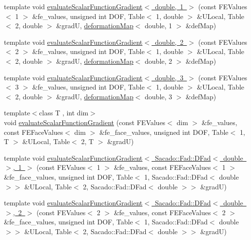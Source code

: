 \begin{DoxyCompactItemize}
\item 
template void \mbox{\hyperlink{function_evaluations_8cc_a3cc57fd0ac6ea503b820934671353e6f}{evaluate\+Scalar\+Function\+Gradient$<$ double, 1 $>$}} (const F\+E\+Values$<$ 1 $>$ \&fe\+\_\+values, unsigned int D\+OF, Table$<$ 1, double $>$ \&U\+Local, Table$<$ 2, double $>$ \&gradU, \mbox{\hyperlink{structdeformation_map}{deformation\+Map}}$<$ double, 1 $>$ \&def\+Map)
\item 
template void \mbox{\hyperlink{function_evaluations_8cc_a22ad018eab8d203fd930ad1209435d89}{evaluate\+Scalar\+Function\+Gradient$<$ double, 2 $>$}} (const F\+E\+Values$<$ 2 $>$ \&fe\+\_\+values, unsigned int D\+OF, Table$<$ 1, double $>$ \&U\+Local, Table$<$ 2, double $>$ \&gradU, \mbox{\hyperlink{structdeformation_map}{deformation\+Map}}$<$ double, 2 $>$ \&def\+Map)
\item 
template void \mbox{\hyperlink{function_evaluations_8cc_a57903628597a149ecf0c07eb33c3cc94}{evaluate\+Scalar\+Function\+Gradient$<$ double, 3 $>$}} (const F\+E\+Values$<$ 3 $>$ \&fe\+\_\+values, unsigned int D\+OF, Table$<$ 1, double $>$ \&U\+Local, Table$<$ 2, double $>$ \&gradU, \mbox{\hyperlink{structdeformation_map}{deformation\+Map}}$<$ double, 3 $>$ \&def\+Map)
\item 
{\footnotesize template$<$class T , int dim$>$ }\\void \mbox{\hyperlink{group___evaluation_functions_ga4622566d0fe19b017cf8d2643ffeb47a}{evaluate\+Scalar\+Function\+Gradient}} (const F\+E\+Values$<$ dim $>$ \&fe\+\_\+values, const F\+E\+Face\+Values$<$ dim $>$ \&fe\+\_\+face\+\_\+values, unsigned int D\+OF, Table$<$ 1, T $>$ \&U\+Local, Table$<$ 2, T $>$ \&gradU)
\item 
template void \mbox{\hyperlink{function_evaluations_8cc_a4a0fd4f75bf25ccf08f6da45df20d5a7}{evaluate\+Scalar\+Function\+Gradient$<$ Sacado\+::\+Fad\+::\+D\+Fad$<$ double $>$, 1 $>$}} (const F\+E\+Values$<$ 1 $>$ \&fe\+\_\+values, const F\+E\+Face\+Values$<$ 1 $>$ \&fe\+\_\+face\+\_\+values, unsigned int D\+OF, Table$<$ 1, Sacado\+::\+Fad\+::\+D\+Fad$<$ double $>$$>$ \&U\+Local, Table$<$ 2, Sacado\+::\+Fad\+::\+D\+Fad$<$ double $>$$>$ \&gradU)
\item 
template void \mbox{\hyperlink{function_evaluations_8cc_a2830ce5e64fad106ba55eb1282bf7f79}{evaluate\+Scalar\+Function\+Gradient$<$ Sacado\+::\+Fad\+::\+D\+Fad$<$ double $>$, 2 $>$}} (const F\+E\+Values$<$ 2 $>$ \&fe\+\_\+values, const F\+E\+Face\+Values$<$ 2 $>$ \&fe\+\_\+face\+\_\+values, unsigned int D\+OF, Table$<$ 1, Sacado\+::\+Fad\+::\+D\+Fad$<$ double $>$$>$ \&U\+Local, Table$<$ 2, Sacado\+::\+Fad\+::\+D\+Fad$<$ double $>$$>$ \&gradU)

\end{DoxyCompactItemize}
